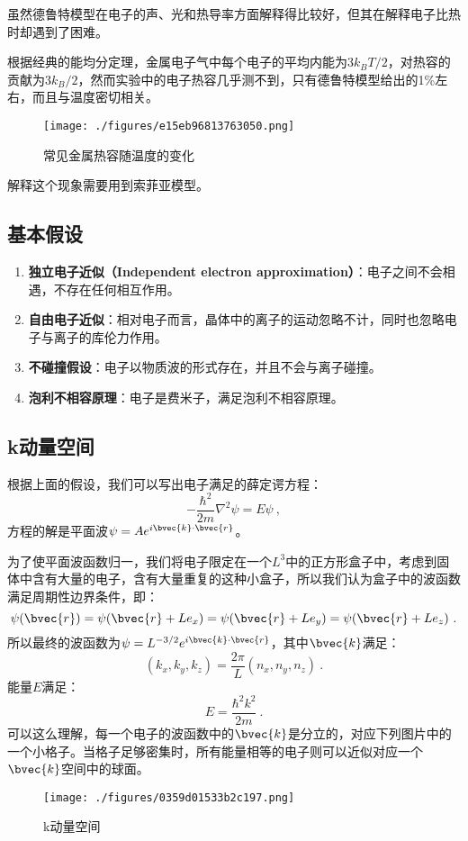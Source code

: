 

虽然德鲁特模型在电子的声、光和热导率方面解释得比较好，但其在解释电子比热时却遇到了困难。

根据经典的能均分定理，金属电子气中每个电子的平均内能为$3k_BT/2$，对热容的贡献为$3k_B/2$，然而实验中的电子热容几乎测不到，只有德鲁特模型给出的1\%左右，而且与温度密切相关。
\begin{figure}[ht]
\centering
\texttt{[image: ./figures/e15eb96813763050.png]}
\caption{常见金属热容随温度的变化} \label{fig_SMFM_1}
\end{figure}
解释这个现象需要用到索菲亚模型。
\subsection{基本假设}
\begin{enumerate}
\item \textbf{独立电子近似（Independent electron approximation）}：电子之间不会相遇，不存在任何相互作用。
\item \textbf{自由电子近似}：相对电子而言，晶体中的离子的运动忽略不计，同时也忽略电子与离子的库伦力作用。
\item \textbf{不碰撞假设}：电子以物质波的形式存在，并且不会与离子碰撞。
\item \textbf{泡利不相容原理}：电子是费米子，满足泡利不相容原理。
\end{enumerate}
\subsection{k动量空间}
根据上面的假设，我们可以写出电子满足的薛定谔方程：
\begin{equation}
-\frac{\hbar^2}{2m}\nabla^2\psi=E\psi~,
\end{equation}
方程的解是平面波$\psi=Ae^{i\bvec{k}\cdot \bvec{r}}$。

为了使平面波函数归一，我们将电子限定在一个$L^3$中的正方形盒子中，考虑到固体中含有大量的电子，含有大量重复的这种小盒子，所以我们认为盒子中的波函数满足周期性边界条件，即：
\begin{equation}
\psi(\bvec{r})=\psi(\bvec{r}+Le_x)=\psi(\bvec{r}+Le_y)=\psi(\bvec{r}+Le_z)~.
\end{equation}
所以最终的波函数为$\psi=L^{-3/2}e^{i\bvec{k}\cdot \bvec{r}}$，其中$\bvec{k}$满足：
\begin{equation}
\left (k_x, k_y, k_z\right )=\frac{2\pi}{L}\left(n_x, n_y, n_z\right )~.
\end{equation}
能量$E$满足：
\begin{equation}
E=\frac{\hbar ^2 k^2}{2m}~.
\end{equation}
可以这么理解，每一个电子的波函数中的$\bvec{k}$是分立的，对应下列图片中的一个小格子。当格子足够密集时，所有能量相等的电子则可以近似对应一个$\bvec{k}$空间中的球面。
\begin{figure}[ht]
\centering
\texttt{[image: ./figures/0359d01533b2c197.png]}
\caption{k动量空间} \label{fig_SMFM_2}
\end{figure}
